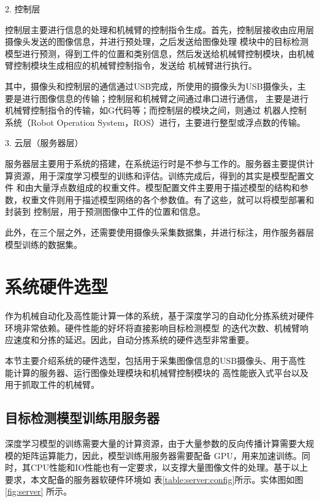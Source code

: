 2. 控制层

控制层主要进行信息的处理和机械臂的控制指令生成。首先，控制层接收由应用层摄像头发送的图像信息，并进行预处理，之后发送给图像处理
模块中的目标检测模型进行预测，得到工件的位置和类别信息，然后发送给机械臂控制模块，由机械臂控制模块生成相应的机械臂控制指令，发送给
机械臂进行执行。

其中，摄像头和控制层的通信通过USB完成，所使用的摄像头为USB摄像头，主要是进行图像信息的传输；控制层和机械臂之间通过串口进行通信，
主要是进行机械臂控制指令的传输，如G代码等；而控制层的模块之间，则通过
机器人控制系统（Robot Operation System，ROS）进行，主要进行整型或浮点数的传输。

3. 云层（服务器层）

服务器层主要用于系统的搭建，在系统运行时是不参与工作的。服务器主要提供计算资源，用于深度学习模型的训练和评估。训练完成后，得到的其实是模型配置文件
和由大量浮点数组成的权重文件。模型配置文件主要用于描述模型的结构和参数，权重文件则用于描述模型网络的各个参数值。有了这些，就可以将模型部署和封装到
控制层，用于预测图像中工件的位置和信息。

此外，在三个层之外，还需要使用摄像头采集数据集，并进行标注，用作服务器层模型训练的数据集。

\section{系统硬件选型}

作为机械自动化及高性能计算一体的系统，基于深度学习的自动化分拣系统对硬件环境非常依赖。硬件性能的好坏将直接影响目标检测模型
的迭代次数、机械臂响应速度和分拣的延迟。因此，自动分拣系统的硬件选型非常重要。

本节主要介绍系统的硬件选型，包括用于采集图像信息的USB摄像头、用于高性能计算的服务器、运行图像处理模块和机械臂控制模块的
高性能嵌入式平台以及用于抓取工件的机械臂。

\subsection{目标检测模型训练用服务器}

深度学习模型的训练需要大量的计算资源，由于大量参数的反向传播计算需要大规模的矩阵运算能力，因此，模型训练用服务器需要配备
GPU，用来加速训练。同时，其CPU性能和IO性能也有一定要求，以支撑大量图像文件的处理。基于以上要求，本文配备的服务器软硬件环境如
表\ref{table:server:config}所示。实体图如图 \ref{fig:server} 所示。

